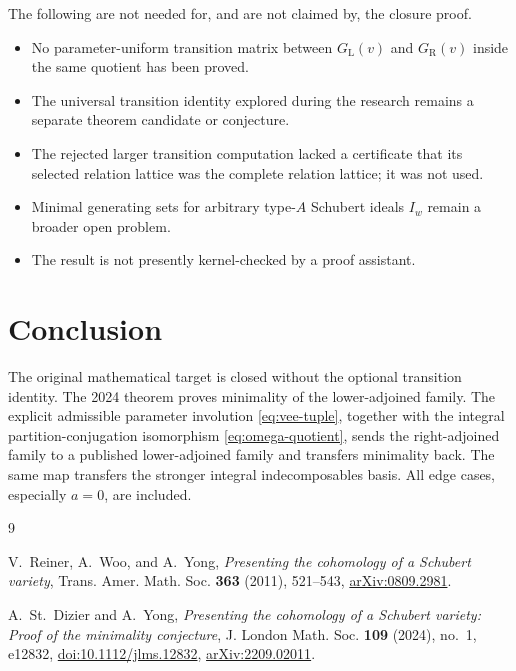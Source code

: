 \documentclass[11pt]{amsart}
\theoremstyle{definition}
\theoremstyle{remark}
\newcommand{\GL}{G_{\mathrm L}}
\newcommand{\GR}{G_{\mathrm R}}
\begin{document}
The following are not needed for, and are not claimed by, the closure proof.
\begin{itemize}
\item No parameter-uniform transition matrix between $\GL(v)$ and $\GR(v)$
inside the same quotient has been proved.
\item The universal transition identity explored during the research remains
a separate theorem candidate or conjecture.
\item The rejected larger transition computation lacked a certificate that
its selected relation lattice was the complete relation lattice; it was not
used.
\item Minimal generating sets for arbitrary type-$A$ Schubert ideals $I_w$
remain a broader open problem.
\item The result is not presently kernel-checked by a proof assistant.
\end{itemize}

\section{Conclusion}

The original mathematical target is closed without the optional transition
identity.  The 2024 theorem proves minimality of the lower-adjoined family.
The explicit admissible parameter involution \eqref{eq:vee-tuple}, together
with the integral partition-conjugation isomorphism
\eqref{eq:omega-quotient}, sends the right-adjoined family to a published
lower-adjoined family and transfers minimality back.  The same map transfers
the stronger integral indecomposables basis.  All edge cases, especially
$a=0$, are included.

\begin{thebibliography}{9}

V.~Reiner, A.~Woo, and A.~Yong,
\emph{Presenting the cohomology of a Schubert variety},
Trans. Amer. Math. Soc. \textbf{363} (2011), 521--543,
\href{https://arxiv.org/abs/0809.2981}{arXiv:0809.2981}.

A.~St.~Dizier and A.~Yong,
\emph{Presenting the cohomology of a Schubert variety: Proof of the
minimality conjecture},
J. London Math. Soc. \textbf{109} (2024), no.~1, e12832,
\href{https://doi.org/10.1112/jlms.12832}{doi:10.1112/jlms.12832},
\href{https://arxiv.org/abs/2209.02011}{arXiv:2209.02011}.

\end{thebibliography}
\end{document}
